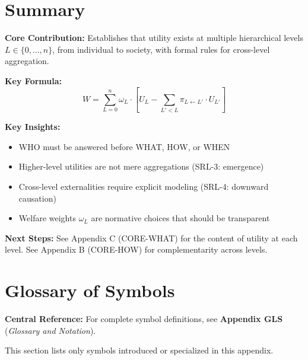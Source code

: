 \section{Summary}
\label{sec:who-summary}

\begin{tcolorbox}[colback=gray!5!white, colframe=gray!75!black,
    title=Appendix AAA Summary: CORE-WHO]

\textbf{Core Contribution:}
Establishes that utility exists at multiple hierarchical levels $L \in \{0, \ldots, n\}$,
from individual to society, with formal rules for cross-level aggregation.

\textbf{Key Formula:}
\begin{equation}
W = \sum_{L=0}^{n} \omega_L \cdot \left[ U_L - \sum_{L' < L} \pi_{L \leftarrow L'} \cdot U_{L'} \right]
\end{equation}

\textbf{Key Insights:}
\begin{itemize}[nosep]
\item WHO must be answered before WHAT, HOW, or WHEN
\item Higher-level utilities are not mere aggregations (SRL-3: emergence)
\item Cross-level externalities require explicit modeling (SRL-4: downward causation)
\item Welfare weights $\omega_L$ are normative choices that should be transparent
\end{itemize}

\textbf{Next Steps:}
See Appendix C (CORE-WHAT) for the content of utility at each level.
See Appendix B (CORE-HOW) for complementarity across levels.

\end{tcolorbox}


\section{Glossary of Symbols}
\label{sec:who-glossary}

\begin{tcolorbox}[colback=blue!5!white, colframe=blue!75!black]
\textbf{Central Reference:} For complete symbol definitions, see
\textbf{Appendix GLS} (\textit{Glossary and Notation}).

This section lists only symbols introduced or specialized in this appendix.
\end{tcolorbox}

